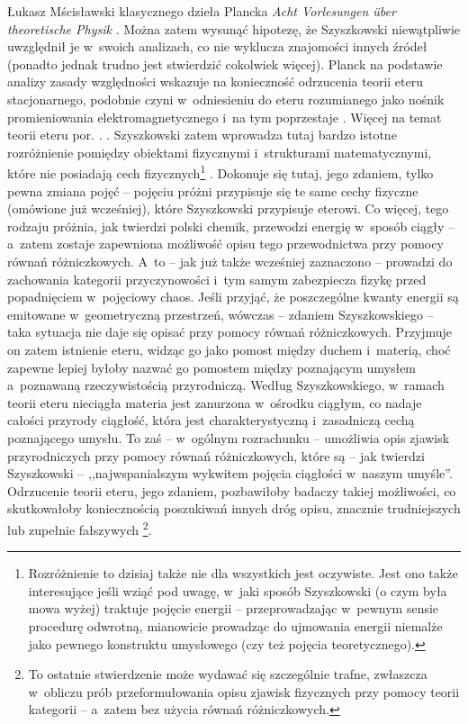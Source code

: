 \begin{artplenv}{Łukasz Mścisławski}
{%
\parencite[][]{szyszkowski_1911} %
 klasycznego dzieła Plancka \textit{Acht Vorlesungen über theoretische Physik} 
\parencite[][]{planck_acht_1910}. %
 Można zatem wysunąć hipotezę, że Szyszkowski niewątpliwie uwzględnił je w~swoich analizach, co nie wyklucza znajomości innych źródeł (ponadto jednak trudno jest stwierdzić cokolwiek więcej). Planck na podstawie analizy zasady względności wskazuje na konieczność odrzucenia teorii eteru stacjonarnego, podobnie czyni w~odniesieniu do eteru rozumianego jako nośnik promieniowania elektromagnetycznego i~na tym poprzestaje 
\parencite[por. zwł.][s.~116]{planck_acht_1910}. %
 Więcej na temat teorii eteru por. 
\parencite[][]{whittaker_history_1953}.%
}.
Szyszkowski zatem wprowadza tutaj bardzo istotne rozróżnienie pomiędzy obiektami fizycznymi i~strukturami matematycznymi, które nie posiadają cech fizycznych\footnote{Rozróżnienie to dzisiaj także nie dla wszystkich jest oczywiste. Jest ono także interesujące jeśli wziąć pod uwagę, w~jaki sposób Szyszkowski (o czym była mowa wyżej) traktuje pojęcie energii -- przeprowadzając w~pewnym sensie procedurę odwrotną, mianowicie prowadząc do ujmowania energii niemalże jako pewnego konstruktu umysłowego (czy też pojęcia teoretycznego).} . Dokonuje się tutaj, jego zdaniem, tylko pewna zmiana pojęć -- pojęciu próżni przypisuje się te same cechy fizyczne (omówione już wcześniej), które Szyszkowski przypisuje eterowi. Co więcej, tego rodzaju próżnia, jak twierdzi polski chemik, przewodzi energię w~sposób ciągły -- a~zatem zostaje zapewniona możliwość opisu tego przewodnictwa przy pomocy równań różniczkowych. A~to -- jak już także wcześniej zaznaczono -- prowadzi do zachowania kategorii przyczynowości i~tym samym zabezpiecza fizykę przed popadnięciem w~pojęciowy chaos. Jeśli przyjąć, że poszczególne kwanty energii są emitowane w~geometryczną przestrzeń, wówczas -- zdaniem Szyszkowskiego -- taka sytuacja nie daje się opisać przy pomocy równań różniczkowych. Przyjmuje on zatem istnienie eteru, widząc go jako pomost między duchem i~materią, choć zapewne lepiej byłoby nazwać go pomostem między poznającym umysłem a~poznawaną rzeczywistością przyrodniczą. Według Szyszkowskiego, w~ramach teorii eteru nieciągła materia jest zanurzona w~ośrodku ciągłym, co nadaje całości przyrody ciągłość, która jest charakterystyczną i~zasadniczą cechą poznającego umysłu. To zaś -- w~ogólnym rozrachunku -- umożliwia opis zjawisk przyrodniczych przy pomocy równań różniczkowych, które są -- jak twierdzi Szyszkowski -- ,,najwspanialszym wykwitem pojęcia ciągłości w~naszym umyśle''. Odrzucenie teorii eteru, jego zdaniem, pozbawiłoby badaczy takiej możliwości, co skutkowałoby koniecznością poszukiwań innych dróg opisu, znacznie trudniejszych lub zupełnie fałszywych 
\parencite[por.][s.~55]{szyszkowski_o_1916}%
\footnote{To ostatnie stwierdzenie może wydawać się szczególnie trafne, zwłaszcza w~obliczu prób przeformułowania opisu zjawisk fizycznych przy pomocy teorii kategorii -- a~zatem bez użycia równań różniczkowych.}.


\end{artplenv}
